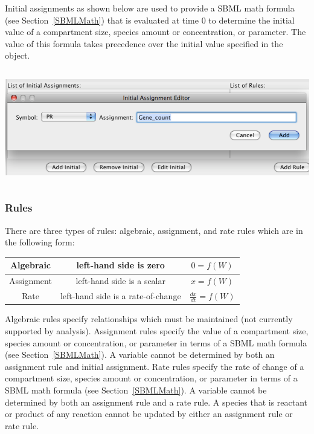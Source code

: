 \documentclass[titlepage,11pt]{article}
\begin{document}
\noindent
Initial assignments as shown below are used to provide a SBML math formula 
(see Section~\ref{SBMLMath}) that is evaluated at time 0 to determine 
the initial value of a compartment size, species amount or
concentration, or parameter.  The value of this formula takes precedence over
the initial value specified in the object.  
\begin{center}
\includegraphics[height=50mm]{screenshots/initial}
\end{center}

\subsubsection{\label{rules}Rules}

\noindent
There are three types of rules: algebraic, assignment, and rate rules
which are in the following form:
\begin{center}
\begin{tabular}{|c|c|c|}
\hline
Algebraic  & left-hand side is zero             & $0 = f(W)$ \\ \hline
Assignment & left-hand side is a scalar         & $x = f(W)$ \\ \hline
Rate       & left-hand side is a rate-of-change & $\frac{dx}{dt} = f(W)$ 
\\ \hline
\end{tabular}
\end{center}
Algebraic rules specify relationships which must be maintained 
(not currently supported by analysis).  Assignment rules specify 
the value of a compartment size, species amount or concentration, or
parameter in terms of a SBML math formula (see
Section~\ref{SBMLMath}).  A variable cannot be determined by
both an assignment rule and initial assignment.  Rate rules specify
the rate of change of a compartment size, species amount or
concentration, or parameter in terms of a SBML math formula
(see Section~\ref{SBMLMath}).  A variable cannot be determined 
by both an assignment rule and a rate rule.  A species that is 
reactant or product of any reaction cannot be updated by either
an assignment rule or rate rule.
\end{document}
